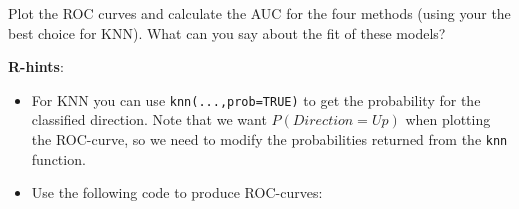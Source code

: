\documentclass[
]{article}
\newenvironment{Shaded}{\begin{snugshade}}{\end{snugshade}}
\newcommand{\CommentTok}[1]{\textcolor[rgb]{0.56,0.35,0.01}{\textit{#1}}}
\newcommand{\DecValTok}[1]{\textcolor[rgb]{0.00,0.00,0.81}{#1}}
\newcommand{\FunctionTok}[1]{\textcolor[rgb]{0.13,0.29,0.53}{\textbf{#1}}}
\newcommand{\NormalTok}[1]{#1}
\newcommand{\OtherTok}[1]{\textcolor[rgb]{0.56,0.35,0.01}{#1}}
\newcommand{\SpecialCharTok}[1]{\textcolor[rgb]{0.81,0.36,0.00}{\textbf{#1}}}
\newcommand{\StringTok}[1]{\textcolor[rgb]{0.31,0.60,0.02}{#1}}
\providecommand{\tightlist}{%
  \setlength{\itemsep}{0pt}\setlength{\parskip}{0pt}}
\begin{document}
Plot the ROC curves and calculate the AUC for the four methods (using
your the best choice for KNN). What can you say about the fit of these
models?

\textbf{R-hints}:

\begin{itemize}
\tightlist
\item
  For KNN you can use \texttt{knn(...,prob=TRUE)} to get the probability
  for the classified direction. Note that we want \(P(Direction = Up)\)
  when plotting the ROC-curve, so we need to modify the probabilities
  returned from the \texttt{knn} function.
\end{itemize}

\begin{Shaded}
\end{Shaded}

\begin{itemize}
\tightlist
\item
  Use the following code to produce ROC-curves:
\end{itemize}
\end{document}

